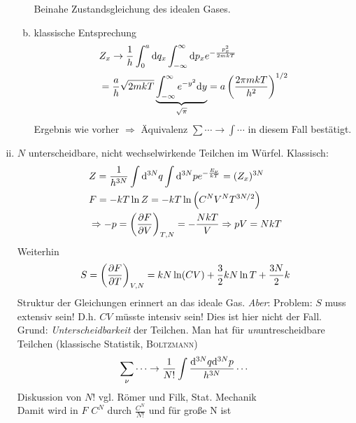\begin{enumerate}[i)]
\begin{enumerate}[a)]
\begin{equation}
        \end{equation}
        Beinahe Zustandsgleichung des idealen Gases.
        \item klassische Entsprechung
        \begin{equation}
            \begin{split}
                & Z_x \rightarrow \frac{1}{h} \int_{0}^{a} \mathrm{d} q_x \int_{-\infty}^{\infty} \mathrm{d} p_x e^{-\frac{p_x^2}{2m kT}} \\
                & = \frac{a}{h} \sqrt{2 m k T} \underbrace{\int_{-\infty}^{\infty} e^{-y^2} \mathrm{d} y}_{\sqrt{\pi}} = a \left( \frac{2 \pi m k T}{h^2} \right)^{1/2}
            \end{split}
        \end{equation}
        Ergebnis wie vorher $\Rightarrow$ Äquivalenz $\sum \cdots \rightarrow \int \cdots$ in diesem Fall bestätigt.
    \end{enumerate}
    \item $N$ unterscheidbare, nicht wechselwirkende Teilchen im Würfel. Klassisch:
    \begin{equation}
        \begin{split}
            & Z = \frac{1}{h^{3N}} \int \mathrm{d}^{3N} q \int \mathrm{d}^{3N}p e^{- \frac{E_\nu}{kT}} = (Z_x)^{3N} \\
            & F = - k T \ln Z = - k T \ln \left( C^N V^N T^{3N/2} \right) \\
            & \Rightarrow - p = \left( \frac{\partial F}{\partial V} \right)_{T, N} = - \frac{N k T}{V} \Rightarrow p V = N k T
        \end{split}
    \end{equation}
    Weiterhin
    \begin{equation}
        S = \left( \frac{\partial F}{\partial T} \right)_{V, N} = k N \ln (CV) + \frac{3}{2} k N \ln T + \frac{3N}{2} k
    \end{equation}
    Struktur der Gleichungen erinnert an das ideale Gas. \emph{Aber}: Problem: $S$ muss extensiv sein! D.h. $CV$ müsste intensiv sein!
    Dies ist hier nicht der Fall. Grund: \emph{Unterscheidbarkeit} der Teilchen. Man hat für \emph{un}untrescheidbare Teilchen (klassische
    Statistik, \textsc{Boltzmann})
    \begin{equation}
        \sum_\nu \cdots \rightarrow \frac{1}{N!} \int \frac{\mathrm{d}^{3N}q \mathrm{d}^{3N}p}{h^{3N}} \cdots
    \end{equation}
    Diskussion von $N!$ vgl. Römer und Filk, Stat. Mechanik \\
    Damit wird in $F$ $C^N$ durch $\frac{C^N}{N!}$ und für große N ist

\end{enumerate}

